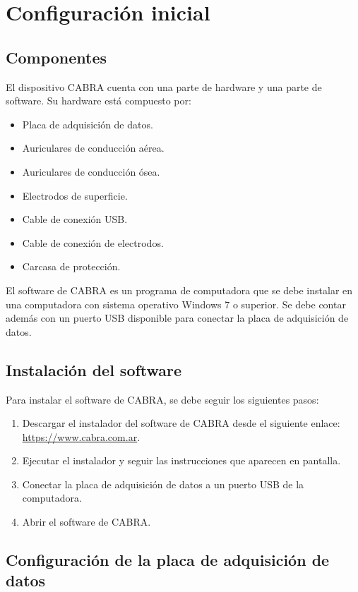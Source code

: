 \section{Configuración inicial} \label{configuracion}
\subsection{Componentes} \label{componentes}
El dispositivo CABRA cuenta con una parte de hardware y una parte de software.
Su hardware está compuesto por:
\begin{itemize}
    \item Placa de adquisición de datos.
    \item Auriculares de conducción aérea.
    \item Auriculares de conducción ósea.
    \item Electrodos de superficie.
    \item Cable de conexión USB.
    \item Cable de conexión de electrodos.
    \item Carcasa de protección.
\end{itemize}

El software de CABRA es un programa de computadora que se debe instalar en una computadora con sistema operativo Windows 7 o superior.
Se debe contar además con un puerto USB disponible para conectar la placa de adquisición de datos.

\subsection{Instalación del software} \label{instalacion}

Para instalar el software de CABRA, se debe seguir los siguientes pasos:
\begin{enumerate}
    \item Descargar el instalador del software de CABRA desde el siguiente enlace: \url{https://www.cabra.com.ar}.
    \item Ejecutar el instalador y seguir las instrucciones que aparecen en pantalla.
    \item Conectar la placa de adquisición de datos a un puerto USB de la computadora.
    \item Abrir el software de CABRA.
\end{enumerate}

\subsection{Configuración de la placa de adquisición de datos} \label{configuracion_placa}

